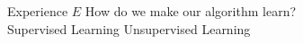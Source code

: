 %

\begin{slide}{Experience $E$}
  \centering
  {\LARGE How do we make our algorithm learn?}\\
  \vspace{1.3cm}
  \large
  \pause
  Supervised Learning %
  \hspace{1cm}
  \pause
  Unsupervised Learning %
\end{slide}
